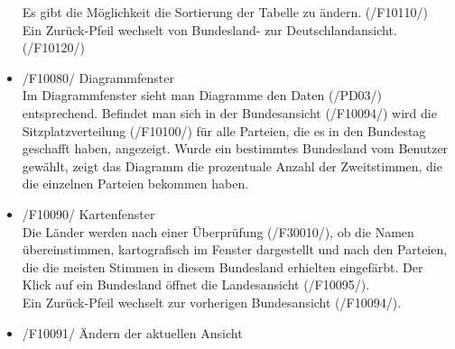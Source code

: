 \documentclass[10pt,a4paper]{article}
\begin{document}
\begin{itemize}
	Es gibt die Möglichkeit die Sortierung der Tabelle zu ändern. (/F10110/) \\
	Ein Zurück-Pfeil wechselt von Bundesland- zur Deutschlandansicht. (/F10120/)
	\item /F10080/ Diagrammfenster \hfill \\
	Im Diagrammfenster sieht man Diagramme den Daten (/PD03/) entsprechend. Befindet man sich in der Bundesansicht (/F10094/) wird die Sitzplatzverteilung (/F10100/) für alle Parteien, die es in den Bundestag geschafft haben, angezeigt. Wurde ein bestimmtes Bundesland vom Benutzer gewählt, zeigt das Diagramm die prozentuale Anzahl der Zweitstimmen, die die einzelnen Parteien bekommen haben.
	\item /F10090/ Kartenfenster \hfill \\
	Die Länder werden nach einer Überprüfung (/F30010/), ob die Namen übereinstimmen, kartografisch im Fenster dargestellt und nach den Parteien, die die meisten Stimmen in diesem Bundesland erhielten eingefärbt. Der Klick auf ein Bundesland öffnet die Landesansicht (/F10095/). \\
	Ein Zurück-Pfeil wechselt zur vorherigen Bundesansicht (/F10094/).
	\item /F10091/ Ändern der aktuellen Ansicht \hfill \\
	

\end{itemize}
\end{document}

